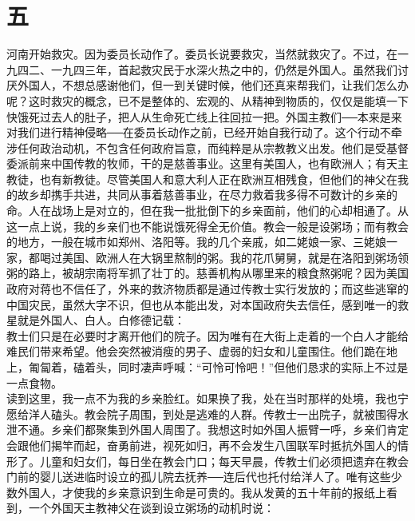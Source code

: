 \fancyhead[RO]{\thepage} %
\fancyhead[LE]{\thepage} %
\fancyfoot[LE,RO]{}
\fancyfoot[LO,CE]{}
\fancyfoot[CO,RE]{}
\chapter*{五}
河南开始救灾。因为委员长动作了。委员长说要救灾，当然就救灾了。不过，在一九四二、一九四三年，首起救灾民于水深火热之中的，仍然是外国人。虽然我们讨厌外国人，不想总感谢他们，但一到关键时候，他们还真来帮我们，让我们怎么办呢？这时救灾的概念，已不是整体的、宏观的、从精神到物质的，仅仅是能填一下快饿死过去人的肚子，把人从生命死亡线上往回拉一把。外国主教们──本来是来对我们进行精神侵略──在委员长动作之前，已经开始自我行动了。这个行动不牵涉任何政治动机，不包含任何政府旨意，而纯粹是从宗教教义出发。他们是受基督委派前来中国传教的牧师，干的是慈善事业。这里有美国人，也有欧洲人；有天主教徒，也有新教徒。尽管美国人和意大利人正在欧洲互相残食，但他们的神父在我的故乡却携手共进，共同从事着慈善事业，在尽力救着我多得不可数计的乡亲的命。人在战场上是对立的，但在我一批批倒下的乡亲面前，他们的心却相通了。从这一点上说，我的乡亲们也不能说饿死得全无价值。教会一般是设粥场；而有教会的地方，一般在城市如郑州、洛阳等。我的几个亲戚，如二姥娘一家、三姥娘一家，都喝过美国、欧洲人在大锅里熬制的粥。我的花爪舅舅，就是在洛阳到粥场领粥的路上，被胡宗南将军抓了壮丁的。慈善机构从哪里来的粮食熬粥呢？因为美国政府对蒋也不信任了，外来的救济物质都是通过传教士实行发放的；而这些逃窜的中国灾民，虽然大字不识，但也从本能出发，对本国政府失去信任，感到唯一的救星就是外国人、白人。白修德记载：\\

教士们只是在必要时才离开他们的院子。因为唯有在大街上走着的一个白人才能给难民们带来希望。他会突然被消瘦的男子、虚弱的妇女和儿童围住。他们跪在地上，匍匐着，磕着头，同时凄声呼喊：“可怜可怜吧！”但他们恳求的实际上不过是一点食物。\\

读到这里，我一点不为我的乡亲脸红。如果换了我，处在当时那样的处境，我也宁愿给洋人磕头。教会院子周围，到处是逃难的人群。传教士一出院子，就被围得水泄不通。乡亲们都聚集到外国人周围了。我想这时如外国人振臂一呼，乡亲们肯定会跟他们揭竿而起，奋勇前进，视死如归，再不会发生八国联军时抵抗外国人的情形了。儿童和妇女们，每日坐在教会门口；每天早晨，传教士们必须把遗弃在教会门前的婴儿送进临时设立的孤儿院去抚养──连后代也托付给洋人了。唯有这些少数外国人，才使我的乡亲意识到生命是可贵的。我从发黄的五十年前的报纸上看到，一个外国天主教神父在谈到设立粥场的动机时说：\\

